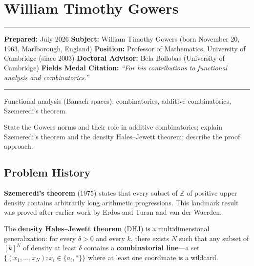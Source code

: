 \chapter{William Timothy Gowers}\label{ch1998williamtimothygowers:william-timothy-gowers-fields-medal-1998-a-comprehensive-report-on-his-work-and-impact}

\begin{center}\rule{0.5\linewidth}{0.5pt}\end{center}

\textbf{Prepared:} July 2026
\textbf{Subject:} William Timothy Gowers (born November 20, 1963, Marlborough, England)
\textbf{Position:} Professor of Mathematics, University of Cambridge (since 2003)
\textbf{Doctoral Advisor:} Bela Bollobas (University of Cambridge)
\textbf{Fields Medal Citation:} \emph{``For his contributions to functional
analysis and combinatorics.''}

\begin{center}\rule{0.5\linewidth}{0.5pt}\end{center}

\begin{prereqs}
Functional analysis (Banach spaces), combinatorics, additive
combinatorics, Szemeredi's theorem.
\end{prereqs}

\begin{objectives}
State the Gowers norms \cite{gowers2001} and their role in additive combinatorics;
explain Szemeredi's theorem and the density Hales--Jewett theorem;
describe the proof approach.
\end{objectives}

\section{Problem History}

\textbf{Szemeredi's theorem} (1975) states that every subset of
$\mathbb{Z}$ of positive upper density contains arbitrarily long
arithmetic progressions.  This landmark result was proved after
earlier work by Erdos and Turan and van der Waerden.

The \textbf{density Hales--Jewett theorem} (DHJ) is a
multidimensional generalization: for every $\delta>0$ and every
$k$, there exists $N$ such that any subset of $[k]^N$ of density
at least $\delta$ contains a \textbf{combinatorial line}---a set
$\{(x_1,\dots,x_N): x_i\in\{a_i,*\}\}$ where at least one
coordinate is a wildcard.


